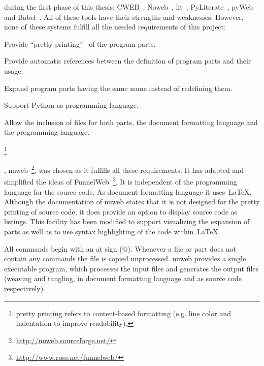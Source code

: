 \documentclass[%
    a4paper,    %
    justified,  %
    nobib,      %
    openany     %
]{tufte-book}
\begin{document}
 during the
first phase of this thesis:
CWEB~,
Noweb~,
lit~,
PyLiterate~,
pyWeb~ and
Babel~. All of these
tools have their strengths and weaknesses.
However, none of these systems fulfill all the needed requirements of this
project:
\begin{enumerate*}
  \item Provide \enquote{pretty printing}~\protect\footnotemark[1]{} of the program parts.
  \item Provide automatic references between the definition of program parts and
    their usage.
  \item Expand program parts having the same name instead of redefining them.
  \item Support Python as programming language.
  \item Allow the inclusion of files for both parts, the document formatting
    language and the programming language.
\end{enumerate*}
\footnote{pretty printing refers to content-based formatting (e.g. line color
  and indentation to improve readability).}

,
nuweb~\footnote{\url{http://nuweb.sourceforge.net/}}, was chosen as it fulfills
all these requirements. It has adapted and simplified the ideas of
FunnelWeb~\footnote{\url{http://www.ross.net/funnelweb/}}. It is independent of
the programming language for the source code. As document formatting language it
uses~\LaTeX{}. Although the documentation of nuweb states that it is not
designed for the pretty printing of source code, it does provide an option to
display source code as listings. This facility has been modified to support
visualizing the expansion of parts as well as to use syntax highlighting of the
code within~\LaTeX{}.

 All
commands begin with an at sign (@). Whenever a file or part does not contain
any commands the file is copied unprocessed. nuweb provides a single executable
program, which processes the input files and generates the output files (weaving
and tangling, in document formatting language and as source code respectively).
\end{document}
